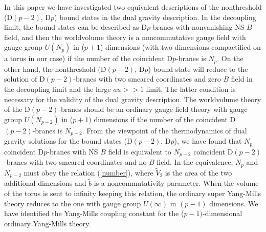 \documentclass[a4paper,12pt]{article}
\begin{document}
In this paper we have investigated two equivalent descriptions of the
nonthreshold (D$(p-2)$, D$p$) bound states in the dual gravity description.
In the decoupling limit, the bound states can be described as D$p$-branes
with nonvanishing NS $B$ field, and then the worldvolume theory is a
noncommutative gauge field with gauge group $U(N_p)$ in ($p+1$) dimensions
(with two dimensions compactified on a torus in our case) if the number of
the coincident D$p$-branes is $N_p$. On the other hand, the nonthreshold
(D$(p-2)$, D$p$) bound state will reduce to the solution of D$(p-2)$-branes
with two smeared coordinates and zero $B$ field in the decoupling limit and
the large $au >>1$ limit. The latter condition is necessary for the validity
of the dual gravity description. The worldvolume theory of the D$(p-2)$-branes
should be an ordinary gauge field theory with gauge group $U(N_{p-2})$ in
($p+1)$ dimensions if the number of the coincident D$(p-2)$-branes is
$N_{p-2}$. From the viewpoint of the thermodynamics of dual gravity solutions
for the bound states (D$(p-2)$, D$p$), we have found that $N_p$ coincident
D$p$-branes with NS $B$ field is equivalent to $N_{p-2}$ coincident
D$(p-2)$-branes with two smeared coordinates and no $B$ field. In the
equivalence, $N_p$ and $N_{p-2}$ must obey the relation (\ref{number}),
where $\tilde{V}_2$ is the area of the two additional dimensions and
$\tilde{b}$ is a noncommutativity parameter. When the volume of the torus is
sent to infinity keeping this relation, the ordinary super Yang-Mills theory
reduces to the one with gauge group $U(\infty)$ in $(p-1)$ dimensions. We
have identified the Yang-Mills coupling constant for the ($p-1)$-dimensional
ordinary Yang-Mills theory.
\end{document}
